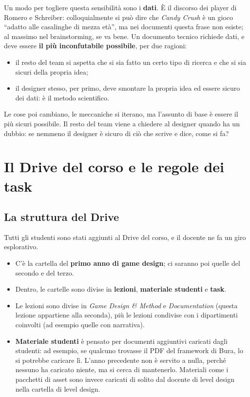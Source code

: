 Un modo per togliere questa sensibilità sono i \textbf{dati}. È il discorso
dei player di Romero e Schreiber: colloquialmente si può dire che
\emph{Candy Crush} è un gioco ``adatto alle casalinghe di mezza età'', ma nei
documenti questa frase non esiste; al massimo nel brainstorming, se va bene.
Un documento tecnico richiede dati, e deve essere \textbf{il più inconfutabile
possibile}, per due ragioni:
\begin{itemize}
  \item il resto del team si aspetta che si sia fatto un certo tipo di
        ricerca e che si sia sicuri della propria idea;
  \item il designer stesso, per primo, deve smontare la propria idea ed
        essere sicuro dei dati: è il metodo scientifico.
\end{itemize}
Le cose poi cambiano, le meccaniche si iterano, ma l'assunto di base è
essere il più sicuri possibile. Il resto del team viene a chiedere al
designer quando ha un dubbio: se nemmeno il designer è sicuro di ciò che
scrive e dice, come si fa?

\section{Il Drive del corso e le regole dei task}
\label{sec:drive-regole}

\subsection{La struttura del Drive}

Tutti gli studenti sono stati aggiunti al Drive del corso, e il docente ne fa
un giro esplorativo.
\begin{itemize}
  \item C'è la cartella del \textbf{primo anno di game design}; ci saranno poi
        quelle del secondo e del terzo.
  \item Dentro, le cartelle sono divise in \textbf{lezioni}, \textbf{materiale
        studenti} e \textbf{task}.
  \item Le lezioni sono divise in \emph{Game Design \& Method} e
        \emph{Documentation} (questa lezione appartiene alla seconda), più le
        lezioni condivise con i dipartimenti coinvolti (ad esempio quelle con
        narrativa).
  \item \textbf{Materiale studenti} è pensato per documenti aggiuntivi caricati
        dagli studenti: ad esempio, se qualcuno trovasse il PDF del framework
        di Bura, lo si potrebbe caricare lì. L'anno precedente non è servito a
        nulla, perché nessuno ha caricato niente, ma si cerca di mantenerlo.
        Materiali come i pacchetti di asset sono invece caricati di solito dal
        docente di level design nella cartella di level design.
\end{itemize}

